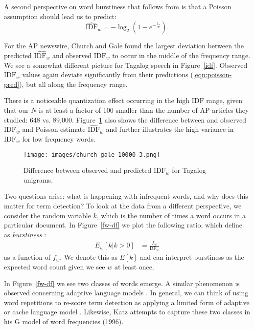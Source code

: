 \documentclass[11pt]{article}
\begin{document}
A second perspective on word burstiness that follows from  is that a Poisson assumption should lead us to predict:
 \begin{equation}
 \label{eqn:poisson-pred}
\widehat{\mathrm{IDF}}_w = -\log_2{\left(1-e^{-\frac{f_w}{N}}\right)}.
 \end{equation}
 
\noindent For the AP newswire, Church and Gale found the largest deviation between the predicted $\widehat{\mathrm{IDF}_w}$ and observed $\mathrm{IDF}_w$ to occur in the middle of the frequency range.   We see a somewhat different picture for Tagalog speech in Figure~\ref{idf}.  Observed $\mathrm{IDF}_w$ values again deviate significantly from their predictions (\ref{eqn:poisson-pred}), but all along the frequency range.  

There is a noticeable quantization effect occurring in the high $\mathrm{IDF}$ range, given that our $N$ is at least a factor of 100 smaller than the number of AP articles they studied: 648 vs. 89,000.  Figure~\ref{img2} also shows the difference between and observed $\mathrm{IDF}_w$ and Poisson estimate $\widehat{\mathrm{IDF}}_w$ and further illustrates the high variance in $\mathrm{IDF}_w$ for low frequency words.  

\begin{figure}[t]
\centering
\texttt{[image: images/church-gale-10000-3.png]}
\begin{caption}{Difference between observed and predicted $\mathrm{IDF}_w$ for Tagalog unigrams.}
\label{img2}
\end{caption}
\end{figure}

Two questions arise: what is happening with infrequent words, and why does this matter for term detection?   To look at the data from a different perspective, we consider the random variable $k$, which is the number of times a word occurs in a particular document.   In Figure~\ref{fw-df} we plot the following ratio, which  define as {\em burstiness} :
\begin{align}
E_w[k|k>0] &= \frac{f_w}{\mathrm{DF}_w}
\end{align}
as a function of $f_w$.  We denote this as $E[k]$ and can interpret burstiness as the expected word count given we see $w$ at least once.  

In Figure~\ref{fw-df} we see two classes of words emerge.  A similar phenomenon is observed concerning adaptive language models \cite{church2000}.  In general, we can think of using word repetitions to re-score term detection as applying a limited form of adaptive or cache language model \cite{Jelinek1997}.  Likewise, Katz attempts to capture these two classes in his G model of word frequencies (1996). \nocite{katz1996}
\end{document}
